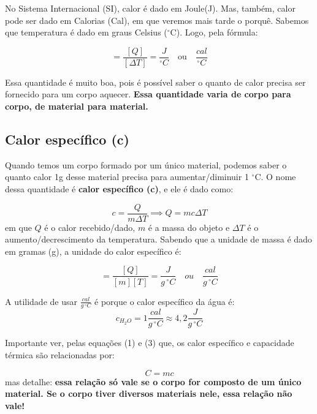 \documentclass[12pt]{extarticle}
\newcommand{\<}{\langle}
\renewcommand{\>}{\rangle}
\theoremstyle{definition}
\newcommand{\grad}{$^\circ$}
\begin{document}
No Sistema Internacional (SI), calor é dado em Joule(J). Mas, também, calor pode ser dado em Calorias (Cal), em que veremos mais tarde o porquê. Sabemos que temperatura é dado em graus Celsius (\grad C). Logo, pela fórmula:

\begin{equation}
    [C] = \frac{[Q]}{[\Delta T]} = \frac{J}{^\circ C} \quad \text{ou} \quad \frac{cal}{^\circ C}
\end{equation}

Essa quantidade é muito boa, pois é possível saber o quanto de calor precisa ser fornecido para um corpo aquecer. \textbf{Essa quantidade varia de corpo para corpo, de material para material.} 

\subsection{Calor específico (c)}

Quando temos um corpo formado por um único material, podemos saber o quanto calor 1g desse material precisa para aumentar/diminuir 1 \grad C. O nome dessa quantidade é \textbf{calor específico (c)}, e ele é dado como:

\begin{equation}
    c = \frac{Q}{m\Delta T} \implies Q = mc\Delta T
\end{equation}
\noindent em que $Q$ é o calor recebido/dado, $m$ é a massa do objeto e $\Delta T$ é o aumento/decrescimento da temperatura. Sabendo que a unidade de massa é dado em gramas (g), a unidade do calor específico é:

\begin{equation}
    [c] = \frac{[Q]}{[m][T]} = \frac{J}{g\,^\circ C} \quad ou \quad \frac{cal}{g\,^\circ C}
\end{equation}

A utilidade de usar $\frac{cal}{g\,^\circ C}$ é porque o calor específico da água é:
\begin{equation}
    c_{H_2O} = 1 \frac{cal}{g\,^\circ C} \approx 4,2 \frac{J}{g\,^\circ C}
\end{equation}

Importante ver, pelas equações (1) e (3) que, os calor específico e capacidade térmica são relacionadas por:

\begin{equation}
    C = mc
\end{equation}
\noindent mas detalhe: \textbf{essa relação só vale se o corpo for composto de um único material. Se o corpo tiver diversos materiais nele, essa relação não vale!}
\end{document}
